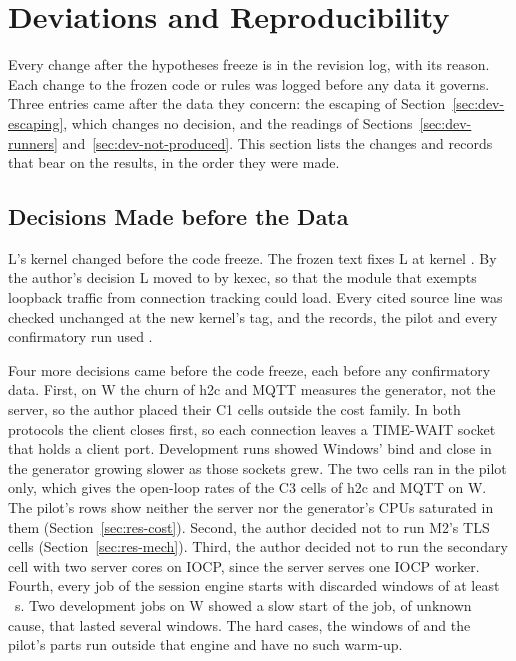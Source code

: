 \section{Deviations and Reproducibility}\label{sec:deviations}

Every change after the hypotheses freeze is in the revision log, with its reason. Each change to
the frozen code or rules was logged before any data it governs. Three entries came after the data
they concern: the escaping of Section~\ref{sec:dev-escaping}, which changes no decision, and the
readings of Sections~\ref{sec:dev-runners} and~\ref{sec:dev-not-produced}. This section lists the changes and records that bear on
the results, in the order they were made.

\subsection{Decisions Made before the Data}\label{sec:dev-before}

L's kernel changed before the code freeze. The frozen text fixes L at kernel \KernelFrozen. By the
author's decision L moved to \KernelL{} by kexec, so that the module that exempts loopback traffic
from connection tracking could load. Every cited source line was checked unchanged at the new
kernel's tag, and the records, the pilot and every confirmatory run used \KernelL.

Four more decisions came before the code freeze, each before any confirmatory data. First, on W the
churn of h2c and MQTT measures the generator, not the server, so the author placed their C1 cells
outside the cost family. In both protocols the client closes first, so each connection leaves a
TIME-WAIT socket that holds a client port. Development runs showed Windows' bind and close in the
generator growing slower as those sockets grew. The two cells ran in the pilot only, which gives the
open-loop rates of the C3 cells of h2c and MQTT on W. The pilot's rows show neither the server nor
the generator's CPUs saturated in them (Section~\ref{sec:res-cost}). Second, the author decided not to run M2's TLS cells
(Section~\ref{sec:res-mech}). Third, the author decided not to run the secondary cell
with two server cores on IOCP, since the server serves one IOCP worker.
Fourth, every job of the session engine starts with discarded windows of at least \JobWarmupS~s.
Two development jobs on W showed a slow start of the job, of unknown cause, that lasted several
windows. The hard cases, the windows of \Kbase{} and the pilot's parts run outside that engine and
have no such warm-up.

